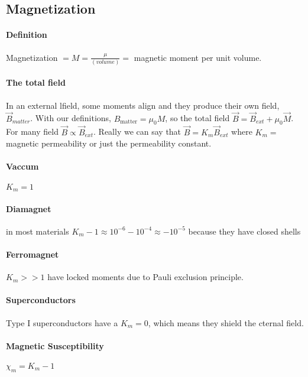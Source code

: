 \documentclass{article}
\begin{document}
    \subsection{Magnetization}
    \paragraph{Definition} Magnetization $ = M = \frac{\mu}{(volume)} = $ magnetic moment per unit volume. 
    \paragraph{The total field}In an external lfield, some moments align and they produce their own field, $\vec{B}_{matter}$.
    With our definitions, $B_{\text{matter}} = \mu_0 M$, so the total field $\vec{B} = \vec{B}_{ext} + \mu_0\vec{M}$. 
    For many field $\vec{B} \propto \vec{B}_{ext}$. 
    Really we can say that $\vec{B} = K_m \vec{B}_{ext}$ where $K_m = $ magnetic permeability or just the permeability constant.
    \paragraph{Vaccum} $K_m = 1$ 
    \paragraph{Diamagnet} in most materials $K_m - 1 \approx 10^{-6} - 10^{-4} \approx -10^{-5}$ because they have closed shells
    \paragraph{Ferromagnet} $K_m >> 1$ have locked moments due to Pauli exclusion principle. 
    \paragraph{Superconductors} Type I superconductors have a $K_m = 0$, which means they shield the cternal field.
    \paragraph{Magnetic Susceptibility} $\chi_m = K_m - 1$ 
\end{document}
